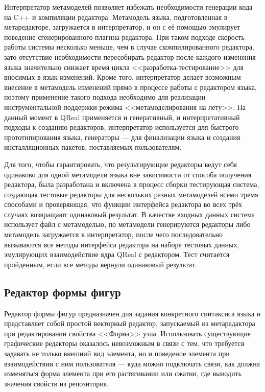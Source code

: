 Интерпретатор метамоделей позволяет избежать необходимости генерации кода на C++ и 
компиляции редактора. Метамодель языка, подготовленная в метаредакторе, загружается 
в интерпретатор, и он с её помощью эмулирует поведение сгенерированного плагина-редактора. 
При таком подходе скорость работы системы несколько меньше, чем в случае скомпилированного 
редактора, зато отсутствие необходимости пересобирать редактор после каждого изменения 
языка значительно снижает время цикла <<разработка-тестирование>> для вносимых в язык 
изменений. Кроме того, интерпретатор делает возможным внесение в метамодель изменений 
прямо в процессе работы с редактором языка, поэтому применение такого подхода необходимо 
для реализации инструментальной поддержки режима <<метамоделирования на лету>>.
На данный момент в QReal применяется и генеративный, и интерпретативный подходы к 
созданию редакторов, интерпретатор используется для быстрого прототипирования языка, 
генераторы --- для финализации языка и создания инсталляционных пакетов, поставляемых 
пользователям. 

Для того, чтобы гарантировать, что результирующие редакторы ведут себя 
одинаково для одной метамодели языка вне зависимости от способа получения редактора, 
была разработана и включена в процесс сборки тестирующая система, создающая тестовые 
редакторы для нескольких разных метамоделей всеми тремя способами и проверяющая, что 
функции интерфейса редактора во всех трёх случаях возвращают одинаковый результат.
В качестве входных данных система использует файл с метамоделью, по метамодели генерируются
редакторы либо метамодель загружается в интерпретатор, после чего последовательно
вызываются все методы интерфейса редактора на наборе тестовых данных, эмулирующих
взаимодействие ядра QReal с редактором. Тест считается пройденным, если все методы
вернули одинаковый результат.

\subsection{Редактор формы фигур}
Редактор формы фигур предназначен для задания конкретного синтаксиса языка и представляет 
собой простой векторный редактор, запускаемый из метаредактора при редактировании свойства 
<<Форма>> узла. Использовать существующие графические редакторы оказалось невозможным 
в связи с тем, что требуется задавать не только внешний вид элемента, но и поведение 
элемента при взаимодействии с ним пользователя --- куда можно подключать связи, как 
должна изменяться форма элемента при его растягивании или сжатии, где выводить значения 
свойств из репозитория.

